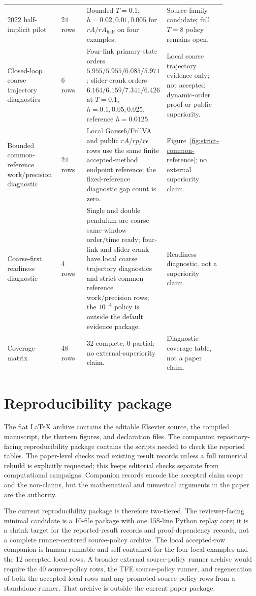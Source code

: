 \documentclass[preprint,12pt]{elsarticle}
\newcommand{\method}{Gauss6\slash FullVA}
\newcommand{\tfe}{TFE}
\begin{document}
\begin{table}[htbp]
\begin{tabular}{P{0.27\linewidth}P{0.16\linewidth}P{0.30\linewidth}P{0.15\linewidth}}
2022 half-implicit pilot &
24 rows &
Bounded $T=0.1$, $h=0.02,0.01,0.005$ for $rA/rA_{\mathrm{half}}$ on four
examples. &
Source-family candidate; full $T=8$ policy remains open. \\
Closed-loop coarse trajectory diagnostics &
6 rows &
Four-link primary-state orders $5.955/5.955/6.085/5.971$; slider-crank
orders $6.164/6.159/7.341/6.426$ at
$T=0.1$, $h=0.1,0.05,0.025$, reference $h=0.0125$. &
Local coarse trajectory evidence only; not accepted dynamic-order proof or
public superiority. \\
Bounded common-reference work/precision diagnostic &
24 rows &
Local \method{} and public $rA/rp/r\epsilon$ rows use the same
finite accepted-method endpoint reference; the fixed-reference diagnostic gap count is zero. &
Figure~\ref{fig:strict-common-reference}; no external superiority claim. \\
Coarse-first readiness diagnostic &
4 rows &
Single and double pendulum are coarse same-window order/time ready; four-link
and slider-crank have local coarse trajectory diagnostics and strict
common-reference work/precision rows; the $10^{-4}$ policy is outside the
default evidence package. &
Readiness diagnostic, not a superiority claim. \\
Coverage matrix &
48 rows &
32 complete, 0 partial; no external-superiority claim. &
Diagnostic coverage table, not a paper claim. \\
\bottomrule
\end{tabular}
\end{table}


\section{Reproducibility package}
\label{sec:repro-appendix}

The flat LaTeX archive contains the editable Elsevier source, the compiled
manuscript, the thirteen figures, and declaration files. The companion
repository-facing reproducibility package contains the scripts needed to check
the reported tables. The paper-level checks read existing result records unless
a full numerical rebuild is explicitly requested; this keeps editorial checks
separate from computational campaigns. Companion records encode the accepted
claim scope and the non-claims, but the mathematical and numerical arguments
in the paper are the authority.

The current reproducibility package is therefore two-tiered.  The
reviewer-facing minimal candidate is a 10-file package with one 158-line
Python replay core; it is a shrink target for the reported-result records and
proof-dependency records, not a complete runner-centered source-policy
archive.  The local accepted-row companion is human-runnable and
self-contained for the four local examples and the 12 accepted local rows.
A broader external source-policy runner archive would require the 40
source-policy rows, the \tfe{} source-policy runner, and regeneration of both
the accepted local rows and any promoted source-policy rows from a standalone
runner.  That archive is outside the current paper package.
\end{document}
